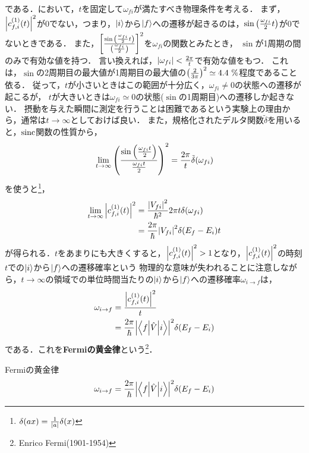 \documentclass{report}
\begin{document}
  である．において，$t$を固定して$\omega_{fi}$が満たすべき物理条件を考える．
  まず，$\abs{c_{f, i}^{(1)}(t)}^2$が0でない，つまり，$\ket{i}$から$\ket{f}$への遷移が起きるのは，$\sin\qty(\frac{\omega_{fi}}{2}t)$が0でないときである．
  また，$\qty[\frac{\sin\qty(\frac{\omega_{fi}}{2}t)}{\qty(\frac{\omega_{fi}}{2})}]^2$を$\omega_{fi}$の関数とみたとき，
  $\sin$が1周期の間のみで有効な値を持つ．
  言い換えれば，$\abs{\omega_{fi}} < \frac{2\pi}{t}$で有効な値をもつ．
  これは，$\sin$の2周期目の最大値が1周期目の最大値の$\qty(\frac{2}{3\pi})^2\simeq 4.4\ \%$程度であること依る．
  従って，$t$が小さいときはこの範囲が十分広く，$\omega_{fi} \neq 0$の状態への遷移が起こるが，
  $t$が大きいときは$\omega_{fi}\simeq 0$の状態($\sin$の1周期目)への遷移しか起きない．
  摂動を与えた瞬間に測定を行うことは困難であるという実験上の理由から，通常は$t \to \infty$としておけば良い．
  また，規格化されたデルタ関数$\tilde{\delta}$を用いると，$\mathrm{sinc}$関数の性質から，
  \begin{align}
    \lim_{t\to\infty}\qty(\frac{\sin\qty(\frac{\omega_{fi} t}{2})}{\frac{\omega_{fi} t}{2}})^2 = \frac{2\pi}{t}\tilde{\delta}(\omega_{fi})
  \end{align}
  を使うと\footnote{$\delta(ax)=\frac{1}{\abs{a}}\delta(x)$}，
  \begin{align}
    \lim_{t\to\infty}\abs{c_{f, i}^{(1)}(t)}^2 &= \frac{\abs{V_{fi}}^2}{\hbar^2}2\pi t\delta(\omega_{fi})\\
    &= \frac{2\pi}{\hbar}\abs{V_{fi}}^2\delta(E_f - E_i)t
  \end{align}
  が得られる．$t$をあまりにも大きくすると，$\abs{c_{f, i}^{(1)}(t)}^2 > 1$となり，$\abs{c_{f, i}^{(1)}(t)}^2$の時刻$t$での$\ket{i}$から$\ket{f}$への遷移確率という
  物理的な意味が失われることに注意しながら，$t\to \infty$の領域での単位時間当たりの$\ket{i}$から$\ket{f}$への遷移確率$\omega_{i\to f}$は，
  \begin{align}
    \omega_{i\to f} &= \frac{\abs{c_{f, i}^{(1)}(t)}^2}{t} \\
    &= \frac{2\pi}{\hbar}\abs{\mel**{f}{\hat{V}}{i}}^2\delta(E_f - E_i)
  \end{align}
  である．これを\textbf{Fermiの黄金律}という\footnote{Enrico Fermi(1901-1954)}．
  \begin{itembox}[l]{Fermiの黄金律}
    \begin{align}
      \omega_{i\to f} = \frac{2\pi}{\hbar}\abs{\mel**{f}{\hat{V}}{i}}^2\delta(E_f - E_i)
    \end{align}
  \end{itembox}
\end{document}
